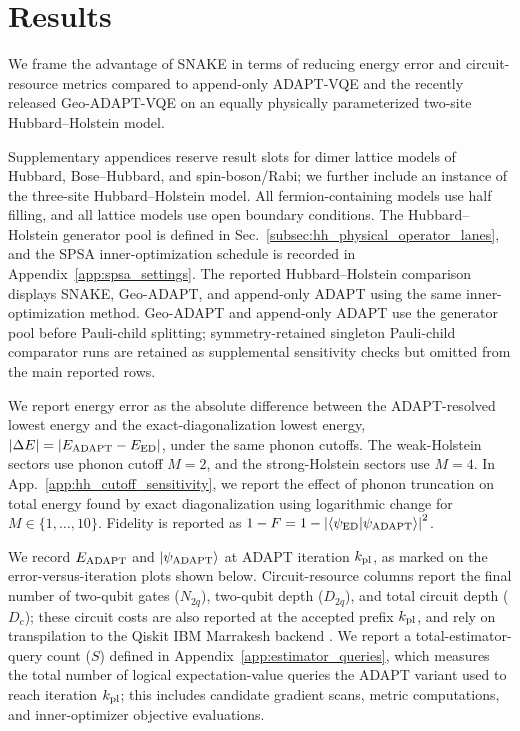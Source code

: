 \documentclass[
  reprint,
  amsmath,
  amssymb,
  aps,
  pra,
  nofootinbib,
  superscriptaddress,
  floatfix
]{revtex4-2}
\newcommand{\ket}[1]{|#1\rangle}
\newcommand{\braket}[2]{\langle #1|#2\rangle}
\begin{document}


\section{Results}
\label{sec:results}
\label{sec:benchmarks}

We frame the advantage of SNAKE in terms of reducing energy error and circuit-resource metrics compared to append-only ADAPT-VQE and the recently released Geo-ADAPT-VQE on an equally physically parameterized two-site Hubbard--Holstein model. 

Supplementary appendices reserve result slots for dimer lattice models of Hubbard, Bose--Hubbard, and spin-boson/Rabi; we further include an instance of the three-site Hubbard--Holstein model. All fermion-containing models use half filling, and all lattice models use open boundary conditions. The Hubbard--Holstein generator pool is defined in Sec.~\ref{subsec:hh_physical_operator_lanes}, and the SPSA inner-optimization schedule is recorded in Appendix~\ref{app:spsa_settings}. The reported Hubbard--Holstein comparison displays SNAKE, Geo-ADAPT, and append-only ADAPT using the same inner-optimization method. Geo-ADAPT and append-only ADAPT use the generator pool before Pauli-child splitting; symmetry-retained singleton Pauli-child comparator runs are retained as supplemental sensitivity checks but omitted from the main reported rows.

We report energy error as the absolute difference between the ADAPT-resolved lowest energy and the exact-diagonalization lowest energy, \(|\Delta E|=|E_{\rm ADAPT}-E_{\rm ED}|\), under the same phonon cutoffs. The weak-Holstein sectors use phonon cutoff \(M=2\), and the strong-Holstein sectors use \(M=4\).
In App.~\ref{app:hh_cutoff_sensitivity}, we report the effect of phonon truncation on total energy found by exact diagonalization using logarithmic change for \(M\in\{1,\ldots,10\}\). Fidelity is reported as \(1-F=1-\left|\braket{\psi_{\rm ED}}{\psi_{\rm ADAPT}}\right|^2\).

We record $E_{\rm{ADAPT}}$ and $\ket{\psi_{\rm{ADAPT}}}$ at ADAPT iteration $k_{\rm{pl}}$, as marked on the error-versus-iteration plots shown below. Circuit-resource columns report the final number of two-qubit gates (\(N_{2q}\)), two-qubit depth (\(D_{2q}\)), and total circuit depth (\(D_c\)); these circuit costs are also reported at the accepted prefix \(k_{\rm pl}\), and rely on transpilation to the Qiskit IBM Marrakesh backend \cite{JavadiAbhari2024Qiskit,QiskitAlgorithmsAdaptVQE}. We report a total-estimator-query count (\(S\)) defined in Appendix~\ref{app:estimator_queries}, which measures the total number of logical expectation-value queries the ADAPT variant used to reach iteration \(k_{\rm pl}\); this includes candidate gradient scans, metric computations, and inner-optimizer objective evaluations.
\end{document}
